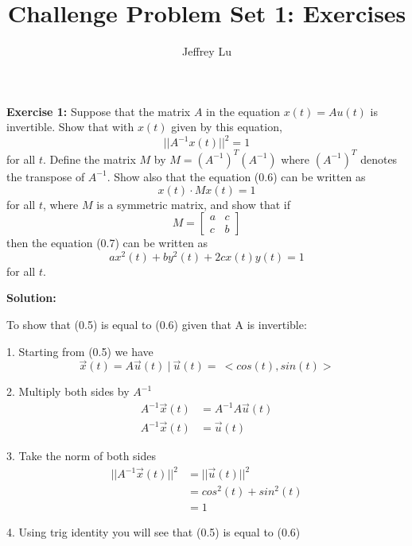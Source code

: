 \documentclass[12pt]{article}
\author{Jeffrey Lu}
\title{Challenge Problem Set 1: Exercises}
\date{}
\begin{document}
\maketitle

\noindent \textbf{Exercise 1:} Suppose that the matrix $A$ in the equation $x(t) = Au(t)$ is invertible. Show that with $x(t)$ given by this equation,
\begin{equation}
    ||A^{-1}x(t)||^{2}=1 \tag{0.6}
\end{equation}
for all $t$. Define the matrix $M$ by $M=(A^{-1})^{T}(A^{-1})$ where $(A^{-1})^{T}$ denotes the transpose of $A^{-1}$. Show also that the equation (0.6) can be written as
\begin{equation}
    x(t)\cdot Mx(t)=1 \tag{0.7}
\end{equation}
for all $t$, where $M$ is a symmetric matrix, and show that if
\[
    M=\begin{bmatrix}a&c\\ c&b\end{bmatrix}
\]
then the equation (0.7) can be written as
\begin{equation}
    ax^{2}(t)+by^{2}(t)+2cx(t)y(t)=1 \tag{0.8}
\end{equation}
for all $t$.

\vspace{0.5cm}

\noindent{}\textbf{Solution:}

\noindent{}To show that (0.5) is equal to (0.6) given that A is invertible:

1. Starting from (0.5) we have
\[
    \vec{x}(t) = A\vec{u}(t)~|~\vec{u}(t) = ~<cos(t), sin(t)> \tag{0.5}
\]

2. Multiply both sides by $A^{-1}$
\begin{align*}
    A^{-1}\vec{x}(t) & = A^{-1}A\vec{u}(t) \\
    A^{-1}\vec{x}(t) & = \vec{u}(t)
\end{align*}

3. Take the norm of both sides
\begin{align*}
    ||A^{-1}\vec{x}(t)||^2 & = ||\vec{u}(t)||^2              \\
                           & = cos^2(t) + sin^2(t)           \\
                           & =  1                  \tag{0.6}
\end{align*}

4. Using trig identity you will see that (0.5) is equal to (0.6)
\end{document}
